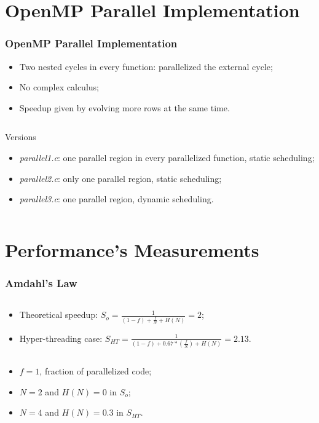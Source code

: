 \documentclass{beamer}
\begin{document}
\section{OpenMP Parallel Implementation}
\begin{frame}
	\frametitle{OpenMP Parallel Implementation}
	\begin{itemize}
		\item Two nested cycles in every function: parallelized the external cycle;
		\item No complex calculus;
		\item Speedup given by evolving more rows at the same time.
	\end{itemize}
	\vfill
	\begin{columns}
		\begin{block}{Versions}
			\begin{itemize}
				\item \emph{parallel1.c}: one parallel region in every parallelized function, static scheduling;
				\item \emph{parallel2.c}: only one parallel region, static scheduling;
				\item \emph{parallel3.c}: one parallel region, dynamic scheduling.
			\end{itemize}
		\end{block}
	\end{columns}
\end{frame}

\section{Performance's Measurements}
\begin{frame}
	\frametitle{Amdahl's Law}
	\begin{columns}
		\column{0.9\textwidth}
		\begin{block}{}
			\begin{itemize}
				\item Theoretical speedup: $S_{o} = \frac{1}{(1-f) + \frac{f}{N} + H(N)} = 2$;
				\item Hyper-threading case: $S_{HT} = \frac{1}{(1-f) + 0.67*(\frac{f}{N}) + H(N)} = 2.13$.
			\end{itemize}
		\end{block}
	\end{columns}
	\vfill
	\begin{itemize}
		\item $f = 1$, fraction of parallelized code;
		\item $N = 2$ and $H(N) = 0$ in $S_{o}$;
		\item $N = 4$ and $H(N) = 0.3$ in $S_{HT}$.
	\end{itemize}
\end{frame}
\end{document}
